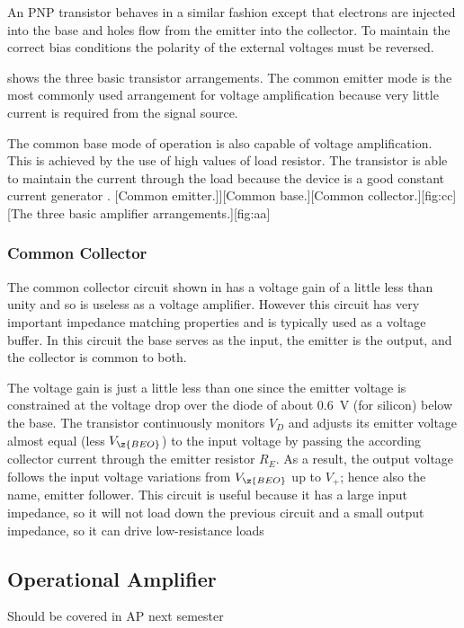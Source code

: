 An PNP transistor behaves in a similar fashion except that electrons are injected into the base and holes flow from the emitter into the collector. To maintain the correct bias conditions the polarity of the external voltages must be reversed.\par
{} shows the three basic transistor arrangements. The common emitter mode is the most commonly used arrangement for voltage amplification because very little current is required from the signal source.\par
The common base mode of operation is also capable of voltage amplification. This is achieved by the use of high values of load resistor. The transistor is able to maintain the current through the load because the device is a good constant current generator \cite{olsen}.
\subfigs[\subfig[.3]{.2}{commonemitter}[Common emitter.]]{[Common base.]}{[Common collector.][fig:cc]}[The three basic amplifier arrangements.][fig:aa]

\subsubsection{Common Collector}
The common collector circuit shown in  has a voltage gain of a little less than unity and so is useless as a voltage amplifier. However this circuit has very important impedance matching properties and is typically used as a voltage buffer. In this circuit the base serves as the input, the emitter is the output, and the collector is common to both.\par
The voltage gain is just a little less than one since the emitter voltage is constrained at the voltage drop over the diode of about \SI{0.6}{\volt} (for silicon) below the base. The transistor continuously monitors $V_{D}$ and adjusts its emitter voltage almost equal (less $V_{\z{BEO}}$) to the input voltage by passing the according collector current through the emitter resistor $R_{E}$. As a result, the output voltage follows the input voltage variations from $V_{\z{BEO}}$ up to $V_{+}$; hence also the name, emitter follower.
This circuit is useful because it has a large input impedance, so it will not load down the previous circuit and a small output impedance, so it can drive low-resistance loads

\subsection{Operational Amplifier}
Should be covered in AP next semester









